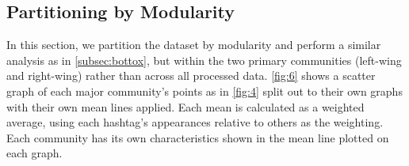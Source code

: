 \documentclass[a4paper,11pt]{article}  %
\begin{document}
	\subsection{Partitioning by Modularity}

	In this section, we partition the dataset by modularity and perform a similar analysis as in \autoref{subsec:bottox}, but within the two primary communities (left-wing and right-wing) rather than across all processed data. \autoref{fig:6} shows a scatter graph of each major community's points as in \autoref{fig:4} split out to their own graphs with their own mean lines applied. Each mean is calculated as a weighted average, using each hashtag's appearances relative to others as the weighting.
	Each community has its own characteristics shown in the mean line plotted on each graph.
	
\end{document}
